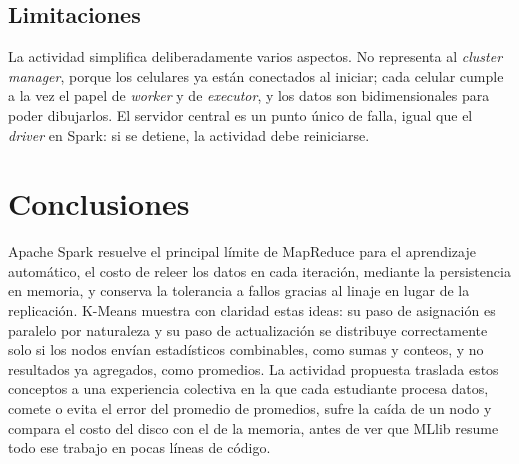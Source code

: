 \documentclass[conference,a4paper]{IEEEtran}
\begin{document}
\subsection{Limitaciones}

La actividad simplifica deliberadamente varios aspectos. No representa al \textit{cluster manager}, porque los celulares ya están conectados al iniciar; cada celular cumple a la vez el papel de \textit{worker} y de \textit{executor}, y los datos son bidimensionales para poder dibujarlos. El servidor central es un punto único de falla, igual que el \textit{driver} en Spark: si se detiene, la actividad debe reiniciarse.

\section{Conclusiones}
\label{sec:conclusiones}

Apache Spark resuelve el principal límite de MapReduce para el aprendizaje automático, el costo de releer los datos en cada iteración, mediante la persistencia en memoria, y conserva la tolerancia a fallos gracias al linaje en lugar de la replicación. K-Means muestra con claridad estas ideas: su paso de asignación es paralelo por naturaleza y su paso de actualización se distribuye correctamente solo si los nodos envían estadísticos combinables, como sumas y conteos, y no resultados ya agregados, como promedios. La actividad propuesta traslada estos conceptos a una experiencia colectiva en la que cada estudiante procesa datos, comete o evita el error del promedio de promedios, sufre la caída de un nodo y compara el costo del disco con el de la memoria, antes de ver que MLlib resume todo ese trabajo en pocas líneas de código.
\end{document}
